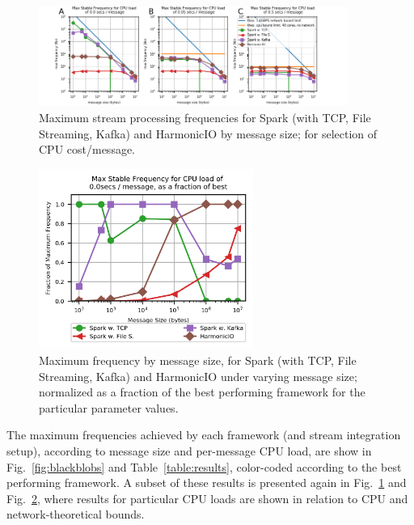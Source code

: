 \documentclass[letterpaper,conference]{IEEEtran}
\begin{document}
\begin{figure}[h]

\begin{center}
\includegraphics[width=0.9\textwidth]{images/selected_simple_plots.png}
\end{center}
\caption{Maximum stream processing frequencies for Spark (with TCP, File Streaming, Kafka) and HarmonicIO by message size; for selection of CPU cost/message.}
\label{fig:all-results}
\end{figure}

\begin{figure}[h]
\begin{center}
\includegraphics[width=7cm]{images/normalized_0.png}
\end{center}
\caption{Maximum frequency by message size, for Spark (with TCP, File Streaming, Kafka) and HarmonicIO under varying message size; normalized as a fraction of the best performing framework for the particular parameter values.}
\label{fig:result-normed}
\end{figure}


The maximum frequencies achieved by each framework (and stream integration setup), according to message size and per-message CPU load, are show in Fig.~\ref{fig:blackblobs} and Table~\ref{table:results}, color-coded according to the best performing framework. 
A subset of these results is presented again in Fig.~\ref{fig:all-results} and Fig.~\ref{fig:result-normed}, where results for particular CPU loads are shown in relation to CPU and network-theoretical bounds.
\end{document}
